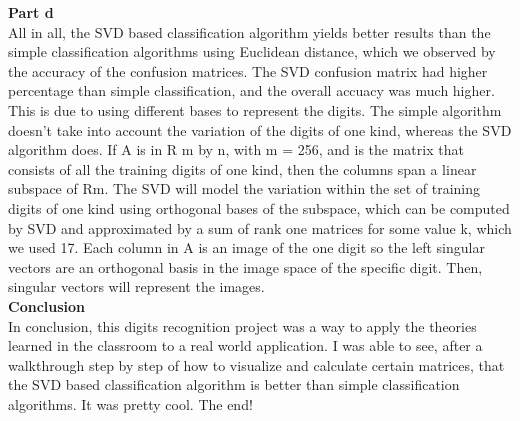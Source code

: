 \documentclass{article}
\begin{document}
\bigskip
\textbf{Part d} \\  
All in all, the SVD based classification algorithm yields better results than the simple classification algorithms using Euclidean distance, which we observed by the accuracy of the confusion matrices. The SVD confusion matrix had higher percentage than simple classification, and the overall accuacy was much higher. This is due to using different bases to represent the digits. The simple algorithm doesn't take into account the variation of the digits of one kind, whereas the SVD algorithm does. If A is in R m by n, with m = 256, and is the matrix that consists of all the training digits of one kind, then the columns span a linear subspace of Rm. The SVD will model the variation within the set of training digits of one kind using orthogonal bases of the subspace, which can be computed by SVD and approximated by a sum of rank one matrices for some value k, which we used 17. Each column in A is an image of the one digit so the left singular vectors are an orthogonal basis in the image space of the specific digit. Then, singular vectors  will represent the images. \\

\bigskip
\bigskip
\textbf{Conclusion} \\  
In conclusion, this digits recognition project was a way to apply the theories learned in the classroom to a real world application. I was able to see, after a walkthrough step by step of how to visualize and calculate certain matrices, that the SVD based classification algorithm is better than simple classification algorithms. It was pretty cool. The end! \\ 
\end{document}
